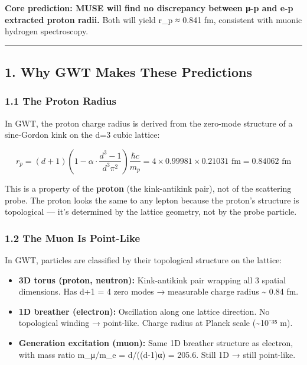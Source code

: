 \documentclass[
]{article}
\providecommand{\tightlist}{%
  \setlength{\itemsep}{0pt}\setlength{\parskip}{0pt}}
\begin{document}
\textbf{Core prediction: MUSE will find no discrepancy between μ-p and
e-p extracted proton radii.} Both will yield r\_p ≈ 0.841 fm, consistent
with muonic hydrogen spectroscopy.

\begin{center}\rule{0.5\linewidth}{0.5pt}\end{center}

\subsection{1. Why GWT Makes These
Predictions}\label{why-gwt-makes-these-predictions}

\subsubsection{1.1 The Proton Radius}\label{the-proton-radius}

In GWT, the proton charge radius is derived from the zero-mode structure
of a sine-Gordon kink on the d=3 cubic lattice:

\[r_p = (d+1)\left(1 - \alpha \cdot \frac{d^3-1}{d^3\pi^2}\right) \frac{\hbar c}{m_p} = 4 \times 0.99981 \times 0.21031 \text{ fm} = 0.84062 \text{ fm}\]

This is a property of the \textbf{proton} (the kink-antikink pair), not
of the scattering probe. The proton looks the same to any lepton because
the proton's structure is topological --- it's determined by the lattice
geometry, not by the probe particle.

\subsubsection{1.2 The Muon Is Point-Like}\label{the-muon-is-point-like}

In GWT, particles are classified by their topological structure on the
lattice:

\begin{itemize}
\tightlist
\item
  \textbf{3D torus (proton, neutron):} Kink-antikink pair wrapping all 3
  spatial dimensions. Has d+1 = 4 zero modes → measurable charge radius
  \textasciitilde{} 0.84 fm.
\item
  \textbf{1D breather (electron):} Oscillation along one lattice
  direction. No topological winding → point-like. Charge radius at
  Planck scale (\textasciitilde10⁻³⁵ m).
\item
  \textbf{Generation excitation (muon):} Same 1D breather structure as
  electron, with mass ratio m\_μ/m\_e = d/((d-1)α) = 205.6. Still 1D →
  still point-like.
\end{itemize}
\end{document}

